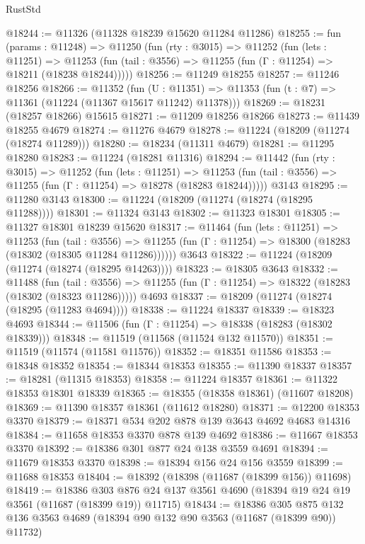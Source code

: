 \begin{lexlean}{RustStd}
\begin{coremodule}
@18244 := @11326 (@11328 @18239 @15620 @11284 @11286)
@18255 := fun (params : @11248) =>
  @11250
    (fun (rty : @3015) =>
    @11252
      (fun (lets : @11251) =>
      @11253 (fun (tail : @3556) => @11255 (fun (Γ : @11254) => @18211 (@18238 @18244)))))
@18256 := @11249 @18255
@18257 := @11246 @18256
@18266 := @11352
    (fun (U : @11351) => @11353 (fun (t : @7) => @11361 (@11224 (@11367 @15617 @11242) @11378)))
@18269 := @18231 (@18257 @18266) @15615
@18271 := @11209 @18256 @18266
@18273 := @11439 @18255 @4679
@18274 := @11276 @4679
@18278 := @11224 (@18209 (@11274 (@18274 @11289)))
@18280 := @18234 (@11311 @4679)
@18281 := @11295 @18280
@18283 := @11224 (@18281 @11316)
@18294 := @11442
    (fun (rty : @3015) =>
    @11252
      (fun (lets : @11251) =>
      @11253 (fun (tail : @3556) => @11255 (fun (Γ : @11254) => @18278 (@18283 @18244)))))
    @3143
@18295 := @11280 @3143
@18300 := @11224 (@18209 (@11274 (@18274 (@18295 @11288))))
@18301 := @11324 @3143
@18302 := @11323 @18301
@18305 := @11327 @18301 @18239 @15620
@18317 := @11464
    (fun (lets : @11251) =>
    @11253
      (fun (tail : @3556) =>
      @11255 (fun (Γ : @11254) => @18300 (@18283 (@18302 (@18305 @11284 @11286))))))
    @3643
@18322 := @11224 (@18209 (@11274 (@18274 (@18295 @14263))))
@18323 := @18305 @3643
@18332 := @11488
    (fun (tail : @3556) => @11255 (fun (Γ : @11254) => @18322 (@18283 (@18302 (@18323 @11286)))))
    @4693
@18337 := @18209 (@11274 (@18274 (@18295 (@11283 @4694))))
@18338 := @11224 @18337
@18339 := @18323 @4693
@18344 := @11506 (fun (Γ : @11254) => @18338 (@18283 (@18302 @18339)))
@18348 := @11519 (@11568 (@11524 @132 @11570))
@18351 := @11519 (@11574 (@11581 @11576))
@18352 := @18351 @11586
@18353 := @18348 @18352
@18354 := @18344 @18353
@18355 := @11390 @18337
@18357 := @18281 (@11315 @18353)
@18358 := @11224 @18357
@18361 := @11322 @18353 @18301 @18339
@18365 := @18355 (@18358 @18361) (@11607 @18208)
@18369 := @11390 @18357 @18361 (@11612 @18280)
@18371 := @12200 @18353 @3370
@18379 := @18371 @534 @202 @878 @139 @3643 @4692 @4683 @14316
@18384 := @11658 @18353 @3370 @878 @139 @4692
@18386 := @11667 @18353 @3370
@18392 := @18386 @301 @877 @24 @138 @3559 @4691
@18394 := @11679 @18353 @3370
@18398 := @18394 @156 @24 @156 @3559
@18399 := @11688 @18353
@18404 := @18392 (@18398 (@11687 (@18399 @156)) @11698)
@18419 := @18386
    @303
    @876
    @24
    @137
    @3561
    @4690
    (@18394 @19 @24 @19 @3561 (@11687 (@18399 @19)) @11715)
@18434 := @18386
    @305
    @875
    @132
    @136
    @3563
    @4689
    (@18394 @90 @132 @90 @3563 (@11687 (@18399 @90)) @11732)

\end{coremodule}
\end{lexlean}
